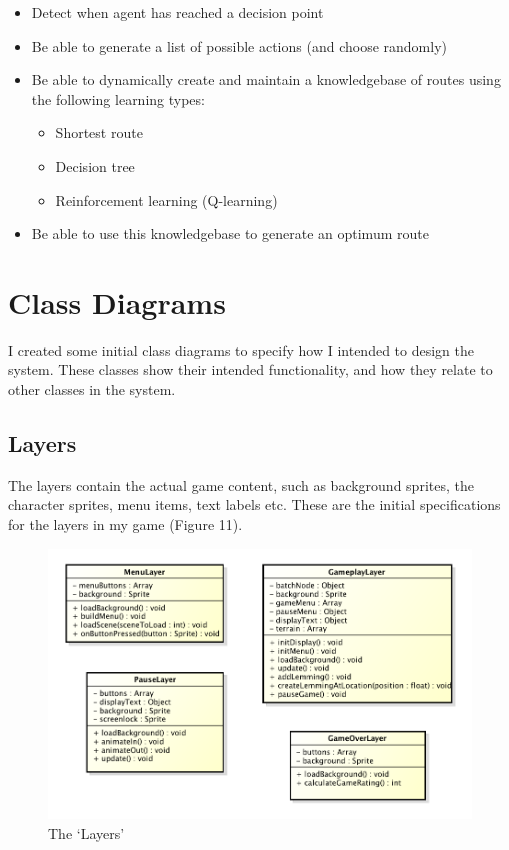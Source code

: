 \documentclass[a4paper,oneside]{report}
\begin{document}
\begin{itemize}
	\item Detect when agent has reached a decision point
	\item Be able to generate a list of possible actions (and choose randomly)
	\item Be able to dynamically create and maintain a knowledgebase of routes using the following learning types:
	\begin{itemize}
		\item Shortest route
		\item Decision tree
		\item Reinforcement learning (Q-learning)
	\end{itemize}
	\item Be able to use this knowledgebase to generate an optimum route
\end{itemize}

\section{Class Diagrams}

I created some initial class diagrams to specify how I intended to design the system. These classes show their intended functionality, and how they relate to other classes in the system. 

\subsection{Layers}

The layers contain the actual game content, such as background sprites, the character sprites, menu items, text labels etc. These are the initial specifications for the layers in my game (Figure 11).

\begin{figure}[h!]
  \centering
    \includegraphics[width=130mm]{sources/images/Layers}
    \caption{The `Layers'}
\end{figure}
\end{document}
